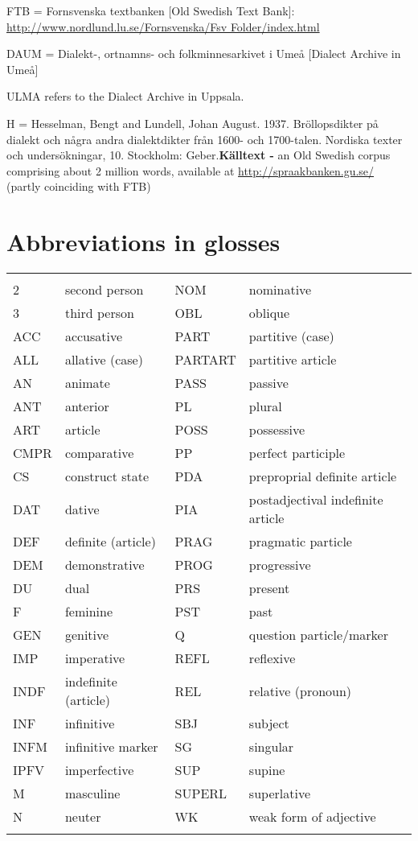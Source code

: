 FTB = Fornsvenska textbanken [Old Swedish Text Bank]: \url{http://www.nordlund.lu.se/Fornsvenska/Fsv Folder/index.html}

DAUM = Dialekt-, ortnamns- och folkminnesarkivet i Umeå [Dialect Archive in Umeå]

ULMA refers to the Dialect Archive in Uppsala.

H = Hesselman, Bengt and Lundell, Johan August. 1937. Bröllopsdikter på dialekt och några andra dialektdikter från 1600- och 1700-talen. Nordiska texter och undersökningar, 10. Stockholm: Geber.\textbf{Källtext - }an Old Swedish corpus comprising about 2 million words, available at \url{http://spraakbanken.gu.se/} (partly coinciding with FTB)

\chapter[Abbreviations in glosses]{Abbreviations in glosses\footnotemark{}}
\footnotetext{}

\begin{tabular}{llll}
\lsptoprule
\multicolumn{4}{l}{1

}\\
2 & second person & NOM & nominative\\
3 & third person & OBL & oblique\\
ACC & accusative & PART & partitive (case)\\
ALL & allative (case) & PARTART & partitive article\\
AN & animate & PASS & passive\\
ANT & anterior & PL & plural\\
ART & article & POSS & possessive\\
CMPR & comparative & PP & perfect participle\\
CS & construct state & PDA & preproprial definite article\\
DAT & dative & PIA & postadjectival indefinite article\\
DEF & definite (article) & PRAG & pragmatic particle\\
DEM & demonstrative & PROG & progressive\\
DU & dual & PRS & present\\
F & feminine & PST & past\\
GEN & genitive & Q & question particle/marker\\
IMP & imperative & REFL & reflexive\\
INDF & indefinite (article) & REL & relative (pronoun)\\
INF & infinitive & SBJ & subject\\
INFM & infinitive marker & SG & singular\\
IPFV & imperfective & SUP & supine\\
M & masculine & SUPERL & superlative\\
N & neuter & WK & weak form of adjective\\
\lspbottomrule
\end{tabular}

